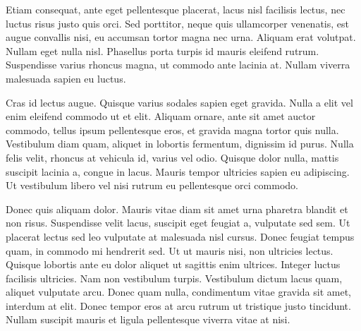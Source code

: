 Etiam consequat, ante eget pellentesque placerat, lacus nisl facilisis lectus, nec luctus risus justo quis orci. Sed porttitor, neque quis ullamcorper venenatis, est augue convallis nisi, eu accumsan tortor magna nec urna. Aliquam erat volutpat. Nullam eget nulla nisl. Phasellus porta turpis id mauris eleifend rutrum. Suspendisse varius rhoncus magna, ut commodo ante lacinia at. Nullam viverra malesuada sapien eu luctus. 

Cras id lectus augue. Quisque varius sodales sapien eget gravida. Nulla a elit vel enim eleifend commodo ut et elit. Aliquam ornare, ante sit amet auctor commodo, tellus ipsum pellentesque eros, et gravida magna tortor quis nulla. Vestibulum diam quam, aliquet in lobortis fermentum, dignissim id purus. Nulla felis velit, rhoncus at vehicula id, varius vel odio. Quisque dolor nulla, mattis suscipit lacinia a, congue in lacus. Mauris tempor ultricies sapien eu adipiscing. Ut vestibulum libero vel nisi rutrum eu pellentesque orci commodo. 

Donec quis aliquam dolor. Mauris vitae diam sit amet urna pharetra blandit et non risus. Suspendisse velit lacus, suscipit eget feugiat a, vulputate sed sem. Ut placerat lectus sed leo vulputate at malesuada nisl cursus. Donec feugiat tempus quam, in commodo mi hendrerit sed. Ut ut mauris nisi, non ultricies lectus. Quisque lobortis ante eu dolor aliquet ut sagittis enim ultrices. Integer luctus facilisis ultricies. Nam non vestibulum turpis. Vestibulum dictum lacus quam, aliquet vulputate arcu. Donec quam nulla, condimentum vitae gravida sit amet, interdum at elit. Donec tempor eros at arcu rutrum ut tristique justo tincidunt. Nullam suscipit mauris et ligula pellentesque viverra vitae at nisi. 